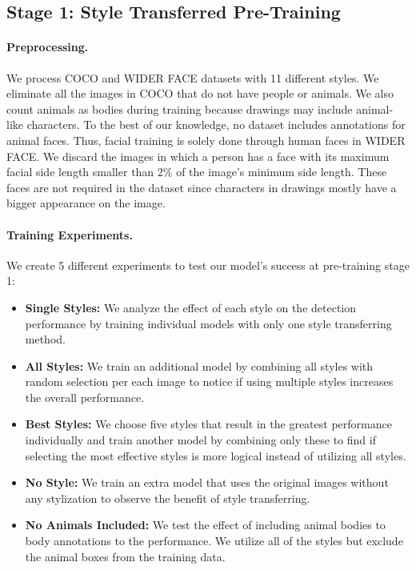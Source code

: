 \documentclass{article}
\begin{document}
\subsection{Stage 1: Style Transferred Pre-Training}

\paragraph{Preprocessing.}{We process COCO and WIDER FACE datasets with 11 different styles. We eliminate all the images in COCO that do not have people or animals. We also count animals as bodies during training because drawings may include animal-like characters. To the best of our knowledge, no dataset includes annotations for animal faces. Thus, facial training is solely done through human faces in WIDER FACE. We discard the images in which a person has a face with its maximum facial side length smaller than 2\% of the image's minimum side length. These faces are not required in the dataset since characters in drawings mostly have a bigger appearance on the image.}

\paragraph{Training Experiments.}{We create 5 different experiments to test our model's success at pre-training stage 1:

\begin{itemize}
    \item \textbf{Single Styles:} We analyze the effect of each style on the detection performance by training individual models with only one style transferring method.
    \item \textbf{All Styles:} We train an additional model by combining all styles with random selection per each image to notice if using multiple styles increases the overall performance.
    \item \textbf{Best Styles:} We choose five styles that result in the greatest performance individually and train another model by combining only these to find if selecting the most effective styles is more logical instead of utilizing all styles.
    \item \textbf{No Style:} We train an extra model that uses the original images without any stylization to observe the benefit of style transferring.
    \item \textbf{No Animals Included:} We test the effect of including animal bodies to body annotations to the performance. We utilize all of the styles but exclude the animal boxes from the training data.
\end{itemize}
}
\end{document}
